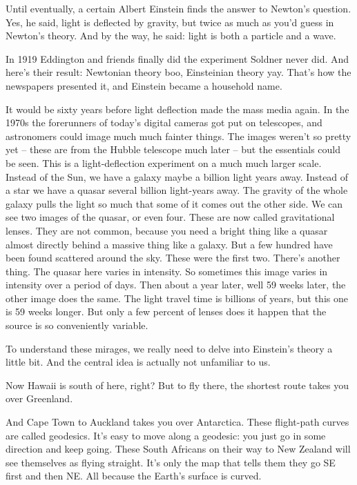 Until eventually, a certain Albert Einstein finds the answer to
Newton's question.  Yes, he said, light is deflected by gravity, but
twice as much as you'd guess in Newton's theory.  And by the way, he
said: light is both a particle and a wave.

\next

In 1919 Eddington and friends finally did the experiment Soldner never
did.  And here's their result: Newtonian theory boo, Einsteinian
theory yay.  That's how the newspapers presented it, and Einstein
became a household name.

\next

It would be sixty years before light deflection made the mass media
again.  In the 1970s the forerunners of today's digital cameras got
put on telescopes, and astronomers could image much much fainter
things.  The images weren't so pretty yet -- these are from the Hubble
telescope much later -- but the essentials could be seen.  This is a
light-deflection experiment on a much much larger scale.  Instead of
the Sun, we have a galaxy maybe a billion light years away.  Instead
of a star we have a quasar several billion light-years away.  The
gravity of the whole galaxy pulls the light so much that some of it
comes out the other side.  We can see two images of the quasar, or
even four.  These are now called gravitational lenses.  They are not
common, because you need a bright thing like a quasar almost directly
behind a massive thing like a galaxy.  But a few hundred have been
found scattered around the sky.  These were the first two.  There's
another thing.  The quasar here varies in intensity.  So sometimes
this image varies in intensity over a period of days.  Then about a
year later, well 59 weeks later, the other image does the same.  The
light travel time is billions of years, but this one is 59 weeks
longer.  But only a few percent of lenses does it happen that the
source is so conveniently variable.

To understand these mirages, we really need to delve into Einstein's
theory a little bit.  And the central idea is actually not unfamiliar
to us.

\next

Now Hawaii is south of here, right?  But to fly there, the shortest
route takes you over Greenland.

\next

And Cape Town to Auckland takes you over Antarctica.  These
flight-path curves are called geodesics.  It's easy to move along a
geodesic: you just go in some direction and keep going.  These South
Africans on their way to New Zealand will see themselves as flying
straight.  It's only the map that tells them they go SE first and then
NE.  All because the Earth's surface is curved.

